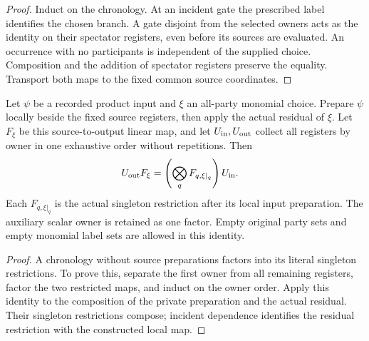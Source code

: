 \begin{proof}\leanok
    Induct on the chronology. At an incident gate the prescribed label
    identifies the chosen branch. A gate disjoint from the selected
    owners acts as the identity on their spectator registers, even
    before its sources are evaluated. An occurrence with no
    participants is independent of the supplied choice. Composition
    and the addition of spectator registers preserve the equality.
    Transport both maps to the fixed common source coordinates.
\end{proof}

\begin{theorem}
    \label{thm:peps_actual_private_factorization}
    \leanok
    Let $\psi$ be a recorded product input and $\xi$ an all-party
    monomial choice. Prepare $\psi$ locally beside the fixed source
    registers, then apply the actual residual of $\xi$.
    Let $F_\xi$ be this source-to-output linear map, and let
    $U_{\rm in},U_{\rm out}$ collect all registers by owner in one
    exhaustive order without repetitions. Then
    \begin{align}
        U_{\rm out}F_\xi
        &=\left(\bigotimes_q F_{q,\xi|_q}\right)U_{\rm in}.
        \label{eq:peps_actual_local_factorization}
    \end{align}
    Each $F_{q,\xi|_q}$ is the actual singleton restriction after its
    local input preparation. The auxiliary scalar owner is retained
    as one factor. Empty original party sets and empty monomial label
    sets are allowed in this identity.
\end{theorem}

\begin{proof}\leanok
    A chronology without source preparations factors into its literal
    singleton restrictions. To prove this, separate the first owner
    from all remaining registers, factor the two restricted maps, and
    induct on the owner order. Apply this identity to the composition
    of the private preparation and the actual residual. Their
    singleton restrictions compose; incident dependence identifies
    the residual restriction with the constructed local map.
\end{proof}

